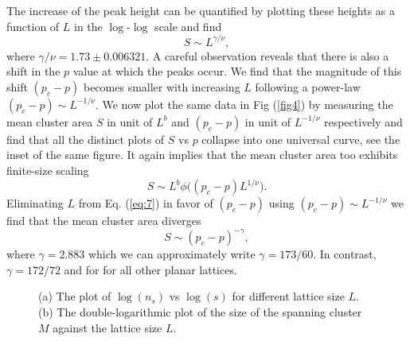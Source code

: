 ﻿\documentclass[twocolumn,showpacs,preprintnumbers,amsmath,amssymb]{revtex4}
\begin{document}
The increase of the peak height can be quantified by plotting 
these heights as a function of $L$ in the $\log$-$\log$ scale and find
\begin{equation}
\label{eq:7}
S\sim L^{\gamma/\nu},
\end{equation}
where $\gamma/\nu=1.73\pm 0.006321$. A careful observation reveals that there is also a shift in the $p$ value at which the peaks occur. 
We find that the magnitude of this shift $(p_c-p)$ becomes smaller with
increasing $L$ following a power-law $(p_c-p)\sim L^{-1/\nu}$. 
 We now plot the same
data in Fig (\ref{fig4}) by measuring the mean cluster area
$S$ in unit of $L^b$ and $(p_c-p)$ in unit of $L^{-1/\nu}$ respectively and find that all the distinct plots of
 $S$ vs $p$ collapse into one universal curve, see the inset of the same figure. It again implies that the mean cluster area too exhibits finite-size scaling
\begin{equation}
\label{eq:8}
S \sim L^{b}\phi \Big ((p_c-p)L^{1/\nu}\Big ).
\end{equation}
Eliminating $L$ from Eq. (\ref{eq:7}) in favor of $(p_c-p)$ using $(p_c-p)\sim L^{-1/\nu}$ we find that the mean cluster
area diverges 
\begin{equation}
\label{eq:9}
S\sim (p_c-p)^{-\gamma},
\end{equation}
where $\gamma=2.883$ which we can approximately write $\gamma=173/60$. In contrast, $\gamma=172/72$  and for for all other planar lattices.


\begin{figure}
\centering
\label{fig:ab}
\caption{(a) The plot of $\log(n_s)$ vs $\log(s)$  for different lattice size $L$.
(b) The double-logarithmic plot of the size of the spanning cluster $M$ against the lattice size $L$. 
} 
\label{fig:ab}
\end{figure}
\end{document}
